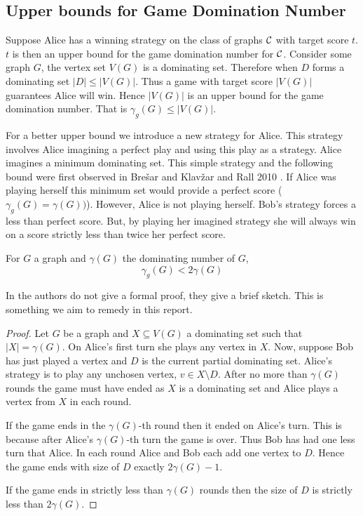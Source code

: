 \subsection{Upper bounds for Game Domination Number}
Suppose Alice has a winning strategy on the class of graphs $\mathcal{C}$ with target score $t$. $t$ is then an upper bound for the game domination number for $\mathcal{C}$. Consider some graph $G$, the vertex set $V(G)$ is a dominating set. Therefore when $D$ forms a dominating set $|D|\leq |V(G)|$. Thus a game with target score $|V(G)|$ guarantees Alice will win. Hence $|V(G)|$ is an upper bound for the game domination number. That is $\gamma_g(G) \leq |V(G)|$. 

For a better upper bound we introduce a new strategy for Alice. This strategy involves Alice imagining a perfect play and using this play as a strategy. Alice imagines a minimum dominating set. This simple strategy and the following bound were first observed in Bre\v{s}ar and Klav\v{z}ar and Rall 2010 \cite{BrKlRa2010}. If Alice was playing herself this minimum set would provide a perfect score ($\gamma_g(G)=\gamma(G))$). However, Alice is not playing herself. Bob's strategy forces a less than perfect score. But, by playing her imagined strategy she will always win on a score strictly less than twice her perfect score.

\begin{theorem}\label{thm:gamedomup}
    For $G$ a graph and $\gamma(G)$ the dominating number of $G$,  
    \[\gamma_g(G)<2\gamma(G)\]
\end{theorem}
In \cite{BrKlRa2010} the authors do not give a formal proof, they give a brief sketch. This is something we aim to remedy in this report. 
\begin{proof}
    Let $G$ be a graph and $X\subseteq V(G)$ a dominating set such that $|X| = \gamma(G)$. On Alice's first turn she plays any vertex in $X$. Now, suppose Bob has just played a vertex and $D$ is the current partial dominating set. Alice's strategy is to play any unchosen vertex, $v\in X\setminus D$. After no more than $\gamma(G)$ rounds the game must have ended as $X$ is a dominating set and Alice plays a vertex from $X$ in each round. 
    
    If the game ends in the $\gamma(G)$-th round then it ended on Alice's turn. This is because after Alice's $\gamma(G)$-th turn the game is over. Thus Bob has had one less turn that Alice. In each round Alice and Bob each add one vertex to $D$. Hence the game ends with size of $D$ exactly $2\gamma(G) -1$. 
    
    If the game ends in strictly less than $\gamma(G)$ rounds then the size of $D$ is strictly less than $2\gamma(G)$.
\end{proof}


